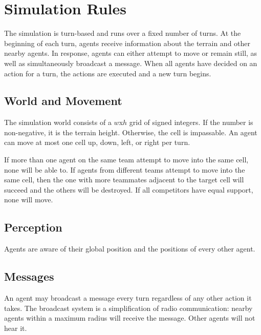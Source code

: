\section{Simulation Rules}
\label{rules}

The simulation is turn-based and runs over a fixed number of turns. At the beginning of each turn, agents receive information about the terrain and other nearby agents. In response, agents can either attempt to move or remain still, as well as simultaneously broadcast a message. When all agents have decided on an action for a turn, the actions are executed and a new turn begins.

\subsection{World and Movement}

The simulation world consists of a $w$x$h$ grid of signed integers. If the number is non-negative, it is the terrain height. Otherwise, the cell is impassable. An agent can move at most one cell up, down, left, or right per turn.


If more than one agent on the same team attempt to move into the same cell, none will be able to. If agents from different teams attempt to move into the same cell, then the one with more teammates adjacent to the target cell will succeed and the others will be destroyed. If all competitors have equal support, none will move.

\subsection{Perception}


Agents are aware of their global position and the positions of every other agent.

\subsection{Messages}

An agent may broadcast a message every turn regardless of any other action it takes. The broadcast system is a simplification of radio communication: nearby agents within a maximum radius will receive the message. Other agents will not hear it.

